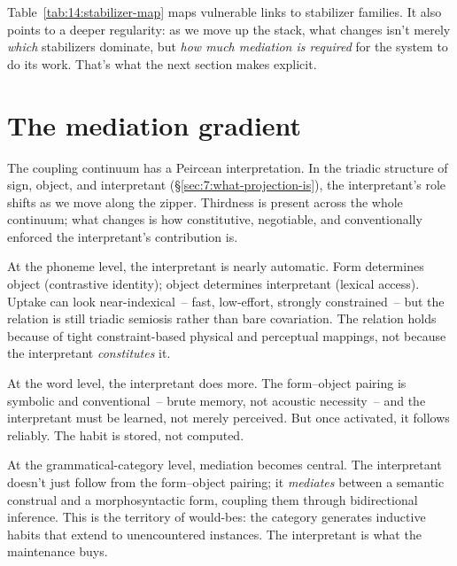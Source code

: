 Table~\ref{tab:14:stabilizer-map} maps vulnerable links to stabilizer families. It also points to a deeper regularity: as we move up the stack, what changes isn't merely \emph{which} stabilizers dominate, but \emph{how much mediation is required} for the system to do its work. That's what the next section makes explicit.

\section{The mediation gradient}
\label{sec:14:mediation}

The coupling continuum has a Peircean interpretation. In the triadic structure of sign, object, and interpretant (§\ref{sec:7:what-projection-is}), the interpretant's role shifts as we move along the zipper. Thirdness is present across the whole continuum; what changes is how constitutive, negotiable, and conventionally enforced the interpretant's contribution is.

At the phoneme level, the interpretant is nearly automatic. Form determines object (contrastive identity); object determines interpretant (lexical access). Uptake can look near-indexical~-- fast, low-effort, strongly constrained~-- but the relation is still triadic semiosis rather than bare covariation. The relation holds because of tight constraint-based physical and perceptual mappings, not because the interpretant \emph{constitutes} it.

At the word level, the interpretant does more. The form--object pairing is symbolic and conventional~-- brute memory, not acoustic necessity~-- and the interpretant must be learned, not merely perceived. But once activated, it follows reliably. The habit is stored, not computed.

At the grammatical-category level, mediation becomes central. The interpretant doesn't just follow from the form--object pairing; it \emph{mediates} between a semantic construal and a morphosyntactic form, coupling them through bidirectional inference. This is the territory of would-bes: the category generates inductive habits that extend to unencountered instances. The interpretant is what the maintenance buys.

